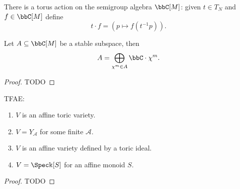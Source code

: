 \begin{definition}
  \label{1-1-tor-act-alg}

  There is a torus action on the semigroup algebra $\bbC[M]$: given $t\in T_N$ and $f\in \bbC[M]$ define
  \[
    t \cdot f = (p \mapsto f(t^{-1}p)).
  \]
\end{definition}


\begin{lemma}
  \label{1-1-16-total-red}
    Let $A \subseteq \bbC[M]$ be a stable subspace, then
    \[
      A = \bigoplus_{\chi^m \in A} \bbC \cdot \chi^m.
    \]
\end{lemma}
\begin{proof}

  TODO
\end{proof}


\begin{theorem}
  \label{thm:1-1-17}
  TFAE:
  \begin{enumerate}
    \item $V$ is an affine toric variety.
    \item $V = Y_{\mathcal A}$ for some finite $\mathcal A$.
    \item $V$ is an affine variety defined by a toric ideal.
    \item $V = \Spec \Bbbk[S]$ for an affine monoid $S$.
  \end{enumerate}
\end{theorem}
\begin{proof}

  TODO
\end{proof}
